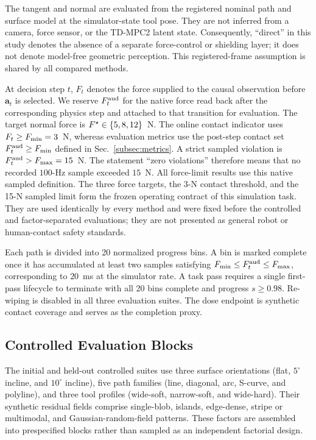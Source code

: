 The tangent and normal are evaluated from the registered nominal path and
surface model at the simulator-state tool pose. They are not inferred from a
camera, force sensor, or the TD-MPC2 latent state. Consequently, ``direct'' in
this study denotes the absence of a separate force-control or shielding layer;
it does not denote model-free geometric perception. This registered-frame
assumption is shared by all compared methods.

At decision step $t$, $F_t$ denotes the force supplied to the causal
observation before $\mathbf{a}_t$ is selected. We reserve $F^{\mathrm{aud}}_t$ for the
native force read back after the corresponding physics step and attached to
that transition for evaluation. The target normal force is
$F^{\star}\in\{5,8,12\}$~N. The online contact indicator uses
$F_t\geq F_{\min}=3$~N, whereas evaluation metrics use the post-step contact set
$F^{\mathrm{aud}}_t\geq F_{\min}$ defined in Sec.~\ref{subsec:metrics}. A strict sampled violation is
$F^{\mathrm{aud}}_t>F_{\max}=15$~N. The statement ``zero
violations'' therefore means that no recorded $100$-Hz sample exceeded
$15$~N. All force-limit results use this native sampled definition.
The three force targets, the 3-N contact threshold, and the 15-N sampled
limit form the frozen operating contract of this simulation task. They are
used identically by every method and were fixed before the controlled and
factor-separated evaluations; they are not presented as general robot or
human-contact safety standards.

Each path is divided into 20 normalized progress bins. A bin is marked
complete once it has accumulated at least two samples satisfying
$F_{\min}\leq F^{\mathrm{aud}}_t\leq F_{\max}$, corresponding to $20$~ms at the simulator
rate. A task pass requires a single first-pass lifecycle to terminate with
all 20 bins complete and progress $s\geq0.98$. Re-wiping is disabled in all
three evaluation suites. The dose endpoint is synthetic contact
coverage and serves as the completion proxy.

\subsection{Controlled Evaluation Blocks}
\label{subsec:controlled_suite}

The initial and held-out controlled suites use three
surface orientations (flat, $5^{\circ}$ incline,
and $10^{\circ}$ incline), five path families (line, diagonal, arc,
S-curve, and polyline), and three tool profiles (wide-soft, narrow-soft, and
wide-hard). Their synthetic residual fields comprise single-blob, islands,
edge-dense, stripe or multimodal, and Gaussian-random-field patterns. These
factors are assembled into prespecified blocks rather than sampled as an
independent factorial design.

